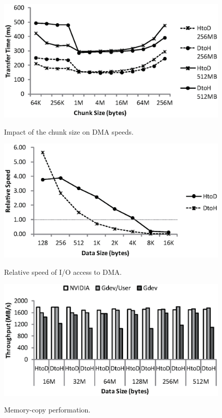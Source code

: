\begin{figure}[t]
 \begin{center}
  \includegraphics[width=0.8\hsize]{eps/chunk.eps}\\
  \vspace{-1.5em}
  \caption{Impact of the chunk size on DMA speeds.}
  \label{fig:chunk}
 \end{center}
 \begin{center}
  \vspace{-0.5em}
  \includegraphics[width=0.8\hsize]{eps/dma.eps}\\
  \vspace{-1.5em}
  \caption{Relative speed of I/O access to DMA.}
  \label{fig:io_access}
 \end{center}
 \begin{center}
  \vspace{-0.5em}
  \includegraphics[width=0.9\hsize]{eps/memcpy.eps}\\
  \vspace{-1.5em}
  \caption{Memory-copy performation.}
  \label{fig:memcpy}
 \end{center}
 \vspace{-2em}
\end{figure}

